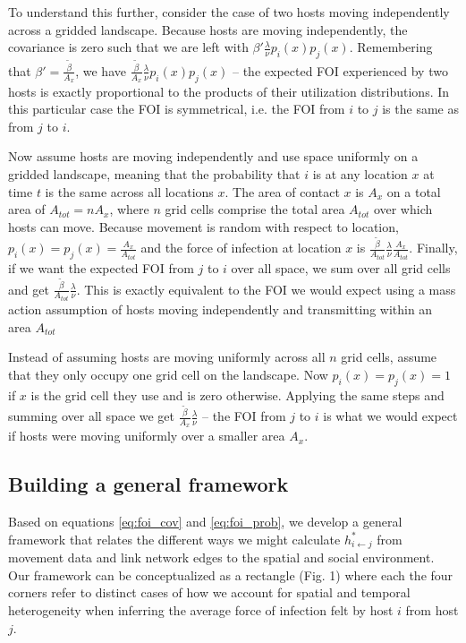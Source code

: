 \documentclass[letterpaper]{article}
\begin{document}
To understand this further, consider the case of two hosts moving independently across a gridded landscape.  Because hosts are moving independently, the covariance is zero such that we are left with $\beta' \frac{\lambda}{\nu} p_i(x)p_j(x)$.  Remembering that $\beta' = \frac{\tilde{\beta}}{A_x}$, we have $\frac{\tilde{\beta}}{A_x} \frac{\lambda}{\nu} p_i(x)p_j(x)$ -- the expected FOI experienced by two hosts is exactly proportional to the products of their utilization distributions. In this particular case the FOI is symmetrical, i.e. the FOI from $i$ to $j$ is the same as from $j$ to $i$.

Now assume hosts are moving independently and use space uniformly on a gridded landscape, meaning that the probability that $i$ is at any location $x$ at time $t$ is the same across all locations $x$. The area of contact $x$ is $A_x$ on a total area of $A_{tot} = n A_x$, where $n$ grid cells comprise the total area $A_{tot}$ over which hosts can move. Because movement is random with respect to location, $p_i(x) = p_j(x) = \frac{A_x}{A_{tot}}$ and the force of infection at location $x$ is $\frac{\tilde{\beta}}{A_{tot}} \frac{\lambda}{\nu} \frac{A_x}{A_{tot}}$.  Finally, if we want the expected FOI from $j$ to $i$ over all space, we sum over all grid cells and get $\frac{\tilde{\beta}}{A_{tot}} \frac{\lambda}{\nu}$. This is exactly equivalent to the FOI we would expect using a mass action assumption of hosts moving independently and transmitting within an area $A_{tot}$ \citep{McCallum2001}

Instead of assuming hosts are moving uniformly across all $n$ grid cells, assume that they only occupy one grid cell on the landscape.  Now $p_i(x) = p_j(x) = 1$ if $x$ is the grid cell they use and is zero otherwise.  Applying the same steps and summing over all space we get $\frac{\tilde{\beta}}{A_{x}} \frac{\lambda}{\nu}$ -- the FOI from $j$ to $i$ is what we would expect if hosts were moving uniformly over a smaller area $A_x$. 

\subsection*{Building a general framework}

Based on equations \ref{eq:foi_cov} and \ref{eq:foi_prob}, we develop a general framework that relates the different ways we might calculate $h^*_{i \leftarrow j}$ from movement data and link network edges to the spatial and social environment. Our framework can be conceptualized as a rectangle (Fig. 1) where each the four corners refer to distinct cases of how we account for spatial and temporal heterogeneity when inferring the average force of infection felt by host $i$ from host $j$.  
\end{document}
